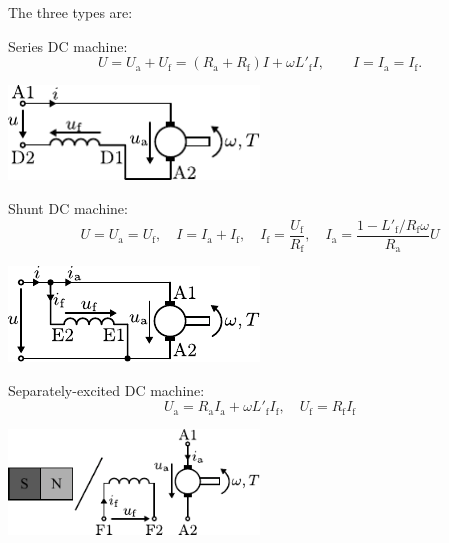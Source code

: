 



\begin{solutionblock}
The three types are:

Series DC machine:
$$ U = U_\mathrm{a} + U_\mathrm{f} = (R_\mathrm{a} + R_\mathrm{f}) I + \omega L'_\mathrm{f} I, \qquad I = I_\mathrm{a} = I_\mathrm{f}.$$ 
\begin{center}
    \includegraphics[width=0.5\textwidth]{../../lecture/fig/lec03/Series_DC_machine.pdf}
\end{center}

Shunt DC machine:
$$ U = U_\mathrm{a} = U_\mathrm{f}, \quad I = I_\mathrm{a} + I_\mathrm{f}, \quad I_\mathrm{f} = \frac{U_\mathrm{f}}{R_\mathrm{f}}, \quad I_\mathrm{a} = \frac{1-L'_\mathrm{f}/R_\mathrm{f}\omega}{R_\mathrm{a}}U$$
\begin{center}
    \includegraphics[width=0.5\textwidth]{../../lecture/fig/lec03/Shunt_DC_machine.pdf}
\end{center}

Separately-excited DC machine:
$$ U_\mathrm{a} = R_\mathrm{a} I_\mathrm{a} + \omega L'_\mathrm{f} I_\mathrm{f}, \quad U_\mathrm{f} = R_\mathrm{f} I_\mathrm{f}$$
\begin{center}
    \includegraphics[width=0.5\textwidth]{../../lecture/fig/lec03/Separately_excited_DC_machine.pdf}
\end{center}
\end{solutionblock}

